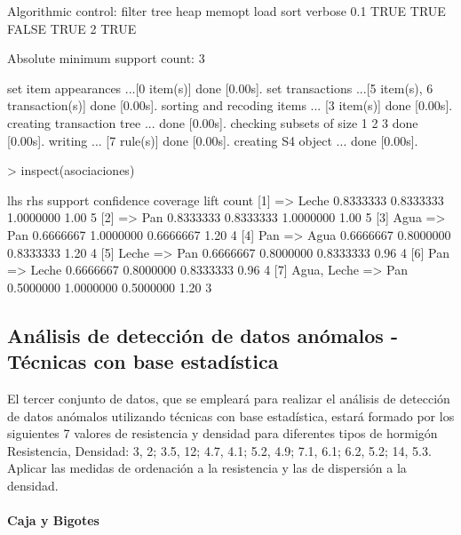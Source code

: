 \documentclass[a4paper, 12pt]{article}
\begin{document}
\begin{Schunk}
\begin{Soutput}
Algorithmic control:
 filter tree heap memopt load sort verbose
    0.1 TRUE TRUE  FALSE TRUE    2    TRUE

Absolute minimum support count: 3 

set item appearances ...[0 item(s)] done [0.00s].
set transactions ...[5 item(s), 6 transaction(s)] done [0.00s].
sorting and recoding items ... [3 item(s)] done [0.00s].
creating transaction tree ... done [0.00s].
checking subsets of size 1 2 3 done [0.00s].
writing ... [7 rule(s)] done [0.00s].
creating S4 object  ... done [0.00s].
\end{Soutput}
\begin{Sinput}
> inspect(asociaciones)
\end{Sinput}
\begin{Soutput}
    lhs              rhs     support   confidence coverage  lift count
[1] {}            => {Leche} 0.8333333 0.8333333  1.0000000 1.00 5    
[2] {}            => {Pan}   0.8333333 0.8333333  1.0000000 1.00 5    
[3] {Agua}        => {Pan}   0.6666667 1.0000000  0.6666667 1.20 4    
[4] {Pan}         => {Agua}  0.6666667 0.8000000  0.8333333 1.20 4    
[5] {Leche}       => {Pan}   0.6666667 0.8000000  0.8333333 0.96 4    
[6] {Pan}         => {Leche} 0.6666667 0.8000000  0.8333333 0.96 4    
[7] {Agua, Leche} => {Pan}   0.5000000 1.0000000  0.5000000 1.20 3    
\end{Soutput}
\end{Schunk}
	\subsection{Análisis de detección de datos anómalos - Técnicas con base estadística}
	
	El tercer conjunto de datos, que se empleará para realizar el análisis de detección de datos anómalos utilizando técnicas con base estadística, estará formado por los siguientes 7 valores de resistencia y densidad para diferentes tipos de hormigón {Resistencia, Densidad}: {3, 2; 3.5, 12; 4.7, 4.1; 5.2, 4.9; 7.1, 6.1; 6.2, 5.2; 14, 5.3}. Aplicar las medidas de ordenación a la resistencia y las de dispersión a la densidad.
	
	\paragraph{Caja y Bigotes}
\end{document}
